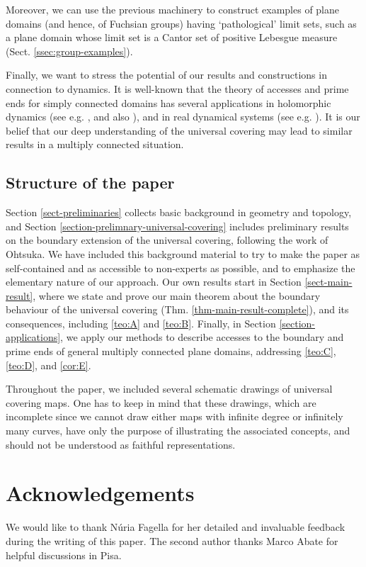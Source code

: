 \documentclass[11pt,a4paper,reqno]{amsart}
\theoremstyle{plain}
\theoremstyle{definition}
\theoremstyle{plain}
\begin{document}
Moreover, we can use the previous machinery to construct examples of plane domains (and hence, of Fuchsian groups) having `pathological' limit sets, such as a plane domain whose limit set is a Cantor set of positive Lebesgue measure (Sect. \ref{ssec:group-examples}).

Finally, we want to stress the potential of our results and constructions in connection to dynamics. It is well-known that the theory of accesses and prime ends for simply connected domains has several applications in holomorphic dynamics (see e.g. \cite{Rempe,BFJK-Accesses,Mam23,JF23}, and  also \cite[Chap. 17]{Milnor}), and in real dynamical systems (see e.g. \cite{prime-ends}). It is our belief that our deep understanding of the universal covering may lead to similar results in a multiply connected situation.

\subsection*{Structure of the paper} Section \ref{sect-preliminaries} collects basic background in geometry and topology, and Section \ref{section-prelimnary-universal-covering} includes preliminary results on the boundary extension of the universal covering, following the work of Ohtsuka. We have included this background material to try to make the paper as self-contained and as accessible to non-experts as possible, and to emphasize the elementary nature of our approach. Our own results start in Section \ref{sect-main-result}, where we state and prove our main theorem about the boundary behaviour of the universal covering (Thm. \ref{thm-main-result-complete}), and its consequences, including \ref{teo:A} and \ref{teo:B}. Finally, in Section \ref{section-applications}, we apply our methods to describe accesses to the boundary and prime ends of general multiply connected plane domains, addressing \ref{teo:C}, \ref{teo:D}, and \ref{cor:E}.

Throughout the paper, we included several schematic drawings of universal covering maps. One has to keep in mind that these drawings, which are incomplete since we cannot draw either maps with infinite degree or infinitely many curves, have only the purpose of illustrating the associated concepts, and should not be understood as faithful representations.

\section*{Acknowledgements}
We would like to thank Núria Fagella for her detailed and invaluable feedback during the writing of this paper. The second author thanks Marco Abate for helpful discussions in Pisa.
\end{document}

